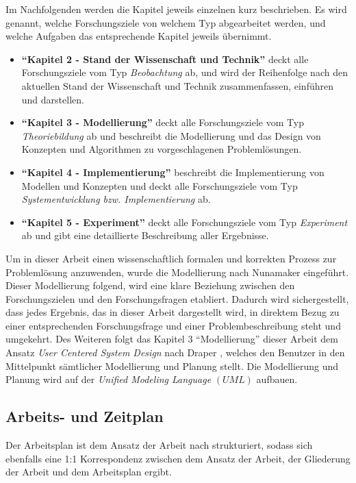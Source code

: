 
\noindent
Im Nachfolgenden werden die Kapitel jeweils einzelnen kurz beschrieben. Es wird genannt, welche Forschungsziele von welchem Typ abgearbeitet werden, und welche Aufgaben das entsprechende Kapitel jeweils übernimmt.
\begin{itemize}
    \setlength{\itemsep}{0pt}
    \item \textbf{\enquote{Kapitel 2 - Stand der Wissenschaft und Technik}} deckt alle Forschungsziele vom Typ \textit{Beobachtung} ab, und wird der Reihenfolge nach den aktuellen Stand der Wissenschaft und Technik zusammenfassen, einführen und darstellen.
    \item \textbf{\enquote{Kapitel 3 - Modellierung}} deckt alle Forschungsziele vom Typ \textit{Theoriebildung} ab und beschreibt die Modellierung und das Design von Konzepten und Algorithmen zu vorgeschlagenen Problemlösungen.
    \item \textbf{\enquote{Kapitel 4 - Implementierung}} beschreibt die Implementierung von Modellen und Konzepten und deckt alle Forschungsziele vom Typ \textit{Systementwicklung bzw. Implementierung} ab.
    \item \textbf{\enquote{Kapitel 5 - Experiment}} deckt alle Forschungsziele vom Typ \textit{Experiment} ab und gibt eine detaillierte Beschreibung aller Ergebnisse.
\end{itemize}
\noindent
Um in dieser Arbeit einen wissenschaftlich formalen und korrekten Prozess zur Problemlösung anzuwenden, wurde die Modellierung nach Nunamaker eingeführt.
Dieser Modellierung folgend, wird eine klare Beziehung zwischen den Forschungszielen und den Forschungsfragen etabliert.
Dadurch wird sichergestellt, dass jedes Ergebnis, das in dieser Arbeit dargestellt wird, in direktem Bezug zu einer entsprechenden Forschungsfrage und einer Problembeschreibung steht und umgekehrt.
\newline
Des Weiteren folgt das Kapitel 3 \enquote{Modellierung} dieser Arbeit dem Ansatz \textit{User Centered System Design} nach Draper \cite{norman-draper-user-centered-system-design}, welches den Benutzer in den Mittelpunkt sämtlicher Modellierung und Planung stellt.
Die Modellierung und Planung wird auf der \textit{Unified Modeling Language} $(UML)$ \cite{uml} aufbauen.

\subsection{Arbeits- und Zeitplan}
\label{sec1:intro:subsec:work-time-plan}
Der Arbeitsplan ist dem Ansatz der Arbeit nach strukturiert, sodass sich ebenfalls eine 1:1 Korrespondenz zwischen dem Ansatz der Arbeit, der Gliederung der Arbeit und dem Arbeitsplan ergibt.

